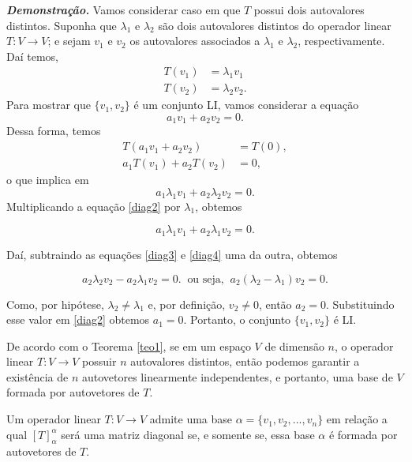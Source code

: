 \textbf{\textit{Demonstração.}} Vamos considerar caso em que $T$ possui dois autovalores distintos. Suponha que  $\lambda_1$ e $\lambda_2$ são dois autovalores distintos do operador linear $T : V \rightarrow V$;  e sejam $v_1$ e $v_2$ os autovalores associados a $\lambda_1$ e $\lambda_2$, respectivamente. Daí temos,
\begin{align}
T(v_1)&=\lambda_1v_1\\ \nonumber
T(v_2)&=\lambda_2v_2.\label{diag1}
\end{align}
Para mostrar que $\{v_1, v_2\}$ é um conjunto LI, vamos considerar a equação
\begin{equation}
a_1v_1+a_2v_2=0.\label{diag2}
\end{equation}
Dessa forma, temos
\begin{align*}
T(a_1v_1+a_2v_2)&=T(0),\\
a_1T(v_1)+a_2T(v_2)&=0,
\end{align*}
o que implica em
\begin{equation}
a_1\lambda_1v_1+a_2\lambda_2v_2=0.\label{diag3}
\end{equation}
Multiplicando a equação \eqref{diag2} por $\lambda_1$, obtemos

\begin{equation}
a_1\lambda_1v_1+a_2\lambda_1v_2=0.\label{diag4}
\end{equation}

Daí, subtraindo as equações \eqref{diag3} e \eqref{diag4} uma da outra, obtemos

$$a_2\lambda_2v_2 - a_2\lambda_1v_2=0. \;\; \text{ou seja,}\;\; a_2(\lambda_2-\lambda_1)v_2=0.$$

Como, por hipótese, $\lambda_2\neq\lambda_1$ e, por definição, $v_2 \neq 0$, então $a_2=0$. Substituindo esse valor em \eqref{diag2} obtemos $a_1=0$. Portanto, o conjunto  $\{v_1, v_2\}$ é LI.

\vspace{0.2cm}
De acordo com  o Teorema \ref{teo1}, se em um espaço $V$ de dimensão $n$, o operador linear $T : V \rightarrow V$ possuir $n$ autovalores distintos, então podemos garantir a existência de $n$ autovetores linearmente independentes, e portanto, uma base de $V$ formada por autovetores de $T$.



\begin{thm} Um operador linear $T : V \rightarrow V$ admite uma base  $\alpha = \{v_1, v_2,...,v_n\}$ em relação a qual $[T]_{\alpha}^{\alpha}$ será uma matriz diagonal se, e somente se, essa  base $\alpha$ é formada por autovetores de $T$.\end{thm}





